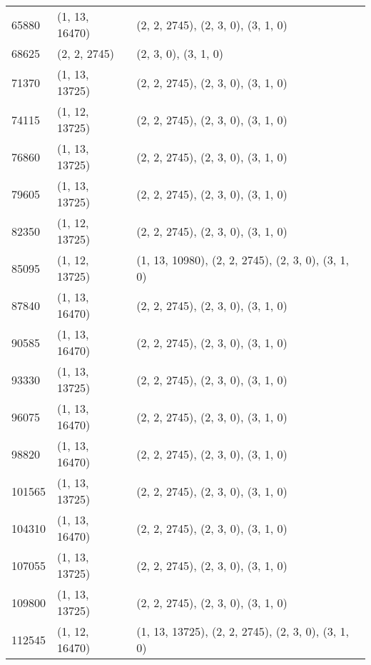 \begin{longtable}{@{\extracolsep{\fill}}lll}
    65880              & (1, 13, 16470)              & (2, 2, 2745), (2, 3, 0), (3, 1, 0)                  \\
    68625              & (2, 2, 2745)                & (2, 3, 0), (3, 1, 0)                                \\
    71370              & (1, 13, 13725)              & (2, 2, 2745), (2, 3, 0), (3, 1, 0)                  \\
    74115              & (1, 12, 13725)              & (2, 2, 2745), (2, 3, 0), (3, 1, 0)                  \\
    76860              & (1, 13, 13725)              & (2, 2, 2745), (2, 3, 0), (3, 1, 0)                  \\
    79605              & (1, 13, 13725)              & (2, 2, 2745), (2, 3, 0), (3, 1, 0)                  \\
    82350              & (1, 12, 13725)              & (2, 2, 2745), (2, 3, 0), (3, 1, 0)                  \\
    85095              & (1, 12, 13725)              & (1, 13, 10980), (2, 2, 2745), (2, 3, 0), (3, 1, 0)  \\
    87840              & (1, 13, 16470)              & (2, 2, 2745), (2, 3, 0), (3, 1, 0)                  \\
    90585              & (1, 13, 16470)              & (2, 2, 2745), (2, 3, 0), (3, 1, 0)                  \\
    93330              & (1, 13, 13725)              & (2, 2, 2745), (2, 3, 0), (3, 1, 0)                  \\
    96075              & (1, 13, 16470)              & (2, 2, 2745), (2, 3, 0), (3, 1, 0)                  \\
    98820              & (1, 13, 16470)              & (2, 2, 2745), (2, 3, 0), (3, 1, 0)                  \\
    101565             & (1, 13, 13725)              & (2, 2, 2745), (2, 3, 0), (3, 1, 0)                  \\
    104310             & (1, 13, 16470)              & (2, 2, 2745), (2, 3, 0), (3, 1, 0)                  \\
    107055             & (1, 13, 13725)              & (2, 2, 2745), (2, 3, 0), (3, 1, 0)                  \\
    109800             & (1, 13, 13725)              & (2, 2, 2745), (2, 3, 0), (3, 1, 0)                  \\
    112545             & (1, 12, 16470)              & (1, 13, 13725), (2, 2, 2745), (2, 3, 0), (3, 1, 0)  \\

\end{longtable}
